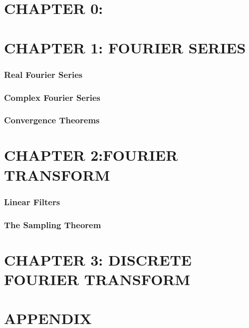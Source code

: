 \documentclass[a4paper]{article}
\begin{document}
\fontsize{10.5}{6}
\selectfont
\begin{multicols}{2}
\section*{CHAPTER 0:}






\section*{CHAPTER 1: FOURIER SERIES}
\subsubsection*{Real Fourier Series}


\subsubsection*{Complex Fourier Series}

\subsubsection*{Convergence Theorems}









\section*{CHAPTER 2:FOURIER TRANSFORM}

\newline



\subsubsection*{Linear Filters}





\subsubsection*{The Sampling Theorem}



\section*{CHAPTER 3: DISCRETE FOURIER TRANSFORM}


\newline


\section*{APPENDIX}


\end{multicols}
\end{document}
